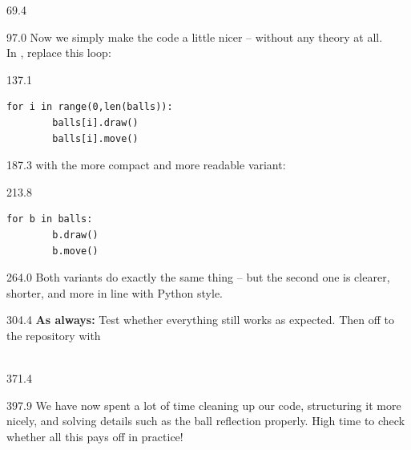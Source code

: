 \documentclass{aslab}
\begin{document}
\nextpage
\begin{region}{69.4}
\end{region}

\begin{region}[pitch=13.5]{97.0}
Now we simply make the code a little nicer -- without any theory at all.\\
In , replace this loop:
\end{region}

\begin{region}[pitch=12.6]{137.1}
\begin{lstlisting}[style=py]
    for i in range(0,len(balls)):
        balls[i].draw()
        balls[i].move()
\end{lstlisting}
\end{region}

\begin{region}{187.3}
with the more compact and more readable variant:
\end{region}

\begin{region}[pitch=12.6]{213.8}
\begin{lstlisting}[style=py]
    for b in balls:
        b.draw()
        b.move()
\end{lstlisting}
\end{region}

\begin{region}[pitch=13.1]{264.0}
Both variants do exactly the same thing -- but the second one is clearer,
shorter, and more in line with Python style.
\end{region}

\begin{region}[pitch=13.6]{304.4}
\textbf{As always:} Test whether everything still works as expected. Then
off to the repository with\\
\\
\end{region}

\begin{region}{371.4}
\end{region}

\begin{region}[pitch=13.2]{397.9}
We have now spent a lot of time cleaning up our code, structuring it more
nicely, and solving details such as the ball reflection properly. High time
to check whether all this pays off in practice!
\end{region}
\end{document}
